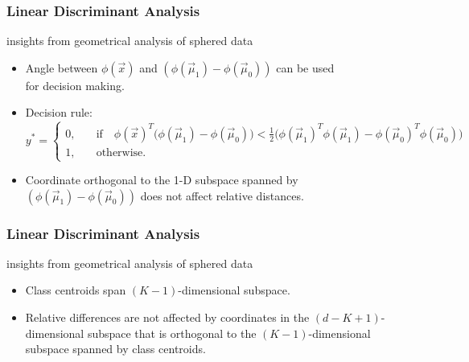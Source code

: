 \begin{frame}
  \frametitle{Linear Discriminant Analysis \cont}

   insights from geometrical analysis of sphered data \\[.3cm]

  \begin{itemize}
    \item Angle between $\phi(\vec x)$ and $(\phi(\vec \mu_1)-\phi(\vec \mu_0))$ can be used \\
      for decision making.\\[.5cm]
    \item Decision rule:
      {\small
      \begin{displaymath}
        y^* = \left\{
                \begin{array}{cl}
                  0, & \quad \mbox{if} \quad 
                       \phi(\vec x)^T \big( \phi(\vec\mu_1) - \phi(\vec\mu_0) \big) < 
                       \frac{1}{2} \big( 
                         \phi(\vec{\mu}_1)^T \phi(\vec{\mu}_1) - 
                         \phi(\vec{\mu}_0)^T \phi(\vec{\mu}_0) 
                        \big) \\[.3cm]
                  1, & \quad \mbox{otherwise}.
                \end{array}
              \right.
      \end{displaymath}
      }
    \item Coordinate orthogonal to the 1-D subspace spanned by $(\phi(\vec \mu_1)-\phi(\vec \mu_0))$ does not affect relative distances.
  \end{itemize}
\end{frame}


\begin{frame}
  \frametitle{Linear Discriminant Analysis \cont}

   insights from geometrical analysis of sphered data \\[.3cm]

  \begin{itemize}
    \item Class centroids span $(K-1)$-dimensional subspace. \\[.5cm]
    \item Relative differences are not affected by coordinates in the $(d-K+1)$-dimensional
          subspace that is orthogonal to the  $(K-1)$-dimensional subspace spanned 
          by class centroids.
  \end{itemize}
\end{frame}


